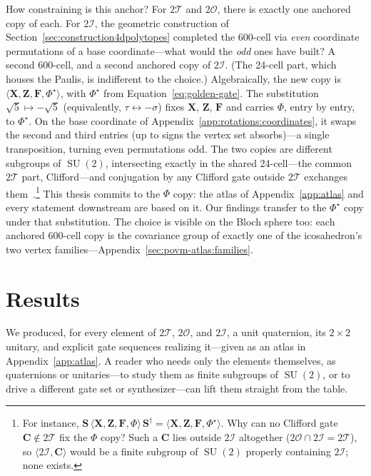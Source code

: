 \documentclass[11pt, oneside, openany]{scrbook}
\DeclareMathOperator{\SU}{SU}
\newcommand{\Tgroup}{\mathcal{T}}  %
\newcommand{\Ogroup}{\mathcal{O}}  %
\newcommand{\Igroup}{\mathcal{I}}  %
\newcommand{\TwoT}{2\Tgroup}
\newcommand{\TwoO}{2\Ogroup}
\newcommand{\TwoI}{2\Igroup}
\newcommand{\phig}{\tau} %
\newcommand{\invphig}{\sigma} %
\begin{document}
How constraining is this anchor? For $\TwoT$ and $\TwoO$, there is exactly one anchored copy of each. For $\TwoI$, the geometric construction of Section~\ref{sec:construction4dpolytopes} completed the 600-cell via \textit{even} coordinate permutations of a base coordinate---what would the \textit{odd} ones have built? A second 600-cell, and a second anchored copy of $\TwoI$. (The 24-cell part, which houses the Paulis, is indifferent to the choice.) Algebraically, the new copy is $\langle \mathbf{X}, \mathbf{Z}, \mathbf{F}, \Phi^\star \rangle$, with $\Phi^\star$ from Equation~\eqref{eq:golden-gate}. The substitution $\sqrt{5} \mapsto -\sqrt{5}$ (equivalently, $\phig \leftrightarrow -\invphig$) fixes $\mathbf{X}$, $\mathbf{Z}$, $\mathbf{F}$ and carries $\Phi$, entry by entry, to $\Phi^\star$. On the base coordinate of Appendix~\ref{app:rotations:coordinates}, it swaps the second and third entries (up to signs the vertex set absorbs)---a single transposition, turning even permutations odd. The two copies are different subgroups of $\SU(2)$, intersecting exactly in the shared 24-cell---the common $\TwoT$ part, Clifford---and conjugation by any Clifford gate outside $\TwoT$ exchanges them~\cite{kubischta2023familyquantumcodes}.\footnote{For instance, $\mathbf{S}\,\langle \mathbf{X}, \mathbf{Z}, \mathbf{F}, \Phi \rangle\,\mathbf{S}^\dagger = \langle \mathbf{X}, \mathbf{Z}, \mathbf{F}, \Phi^\star \rangle$. Why can no Clifford gate $\mathbf{C} \notin \TwoT$ fix the $\Phi$ copy? Such a $\mathbf{C}$ lies outside $\TwoI$ altogether ($\TwoO \cap \TwoI = \TwoT$), so $\langle \TwoI, \mathbf{C} \rangle$ would be a finite subgroup of $\SU(2)$ properly containing $\TwoI$; none exists.} This thesis commits to the $\Phi$ copy: the atlas of Appendix~\ref{app:atlas} and every statement downstream are based on it. Our findings transfer to the $\Phi^\star$ copy under that substitution. The choice is visible on the Bloch sphere too: each anchored 600-cell copy is the covariance group of exactly one of the icosahedron's two vertex families---Appendix~\ref{sec:povm-atlas:families}.

\chapter{Results} \label{cha:results}

We produced, for every element of $\TwoT$, $\TwoO$, and $\TwoI$, a unit quaternion, its $2\times2$ unitary, and explicit gate sequences realizing it---given as an atlas in Appendix~\ref{app:atlas}. A reader who needs only the elements themselves, as quaternions or unitaries---to study them as finite subgroups of $\SU(2)$, or to drive a different gate set or synthesizer---can lift them straight from the table.
\end{document}
